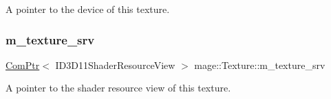 A pointer to the device of this texture. \hypertarget{classmage_1_1_texture_a8666bb39618e89e782c7cfeabebcc2b0}{}\label{classmage_1_1_texture_a8666bb39618e89e782c7cfeabebcc2b0} 
\subsubsection{\texorpdfstring{m\+\_\+texture\+\_\+srv}{m\_texture\_srv}}
{\footnotesize\ttfamily \hyperlink{namespacemage_ae74f374780900893caa5555d1031fd79}{Com\+Ptr}$<$ I\+D3\+D11\+Shader\+Resource\+View $>$ mage\+::\+Texture\+::m\+\_\+texture\+\_\+srv\hspace{0.3cm}{\ttfamily [private]}}

A pointer to the shader resource view of this texture. 
